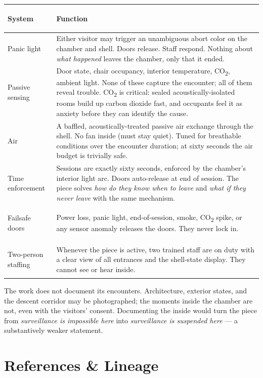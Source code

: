 \documentclass[]{anvil-installation}
\begin{document}
\begin{metricbox}
\begin{tabularx}{\textwidth}{@{} >{\bfseries\raggedright\arraybackslash}p{2.4cm} X @{}}
\toprule
\textbf{System} & \textbf{Function} \\
\midrule
Panic light & Either visitor may trigger an unambiguous abort color on the chamber and shell. Doors release. Staff respond. Nothing about \textit{what happened} leaves the chamber, only that it ended. \\
Passive sensing & Door state, chair occupancy, interior temperature, CO\textsubscript{2}, ambient light. None of these capture the encounter; all of them reveal trouble. CO\textsubscript{2} is critical: sealed acoustically-isolated rooms build up carbon dioxide fast, and occupants feel it as anxiety before they can identify the cause. \\
Air & A baffled, acoustically-treated passive air exchange through the shell. No fan inside (must stay quiet). Tuned for breathable conditions over the encounter duration; at sixty seconds the air budget is trivially safe. \\
Time enforcement & Sessions are exactly sixty seconds, enforced by the chamber's interior light arc. Doors auto-release at end of session. The piece solves \textit{how do they know when to leave} and \textit{what if they never leave} with the same mechanism. \\
Failsafe doors & Power loss, panic light, end-of-session, smoke, CO\textsubscript{2} spike, or any sensor anomaly releases the doors. They never lock in. \\
Two-person staffing & Whenever the piece is active, two trained staff are on duty with a clear view of all entrances and the shell-state display. They cannot see or hear inside. \\
\bottomrule
\end{tabularx}
\end{metricbox}

The work does not document its encounters. Architecture, exterior states, and the descent corridor may be photographed; the moments inside the chamber are not, even with the visitors' consent. Documenting the inside would turn the piece from \textit{surveillance is impossible here} into \textit{surveillance is suspended here} --- a substantively weaker statement.

\section{References \& Lineage}
\end{document}
